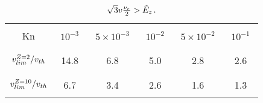 
\begin{table}
\begin{center}
  \begin{tabular}{c|ccccc}
    \hline\hline\\
    Kn & $\,\,10^{-3}\,\,$ & $\,\,5\times10^{-3}\,\,$ & $\,\,10^{-2}\,\,$ & $\,\,5\times10^{-2}\,\,$ & $\,\,10^{-1}\,\,$ \\\\
    \hline\\
    $v_{lim}^{Z=2} / v_{th}$ & 14.8 & 6.8 & 5.0 & 2.8 & 2.6 \\\\
    \hline\\
    $v_{lim}^{Z=10} / v_{th}$ & 6.7 & 3.4 & 2.6 & 1.6 & 1.3 \\\\
    \hline\hline
  \end{tabular}
  \caption{
  $\sqrt{3}v\frac{\nu_{e}}{2} > \tilde{E}_z$.
  }
\end{center}
\label{tab:vlim}
\end{table}

